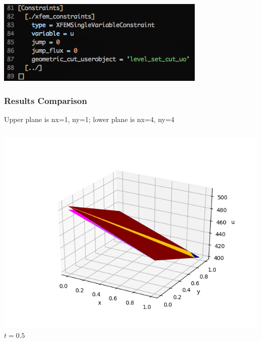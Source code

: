 \documentclass[]{beamer}
\begin{document}
\begin{frame}
\begin{columns}
\begin{center}
			\end{center}
	\end{columns}
	\begin{center}
	\includegraphics[scale=0.4]{figures/Screen-Constraints-2Dxyh1m}
	\end{center}
\end{frame}

\begin{frame}[t]\frametitle{Results Comparison}
  Upper plane is nx=1, ny=1; lower plane is nx=4, ny=4
  	\begin{columns}
			\begin{center}
			\includegraphics[scale=0.2]{figures/2D_xy_homog1mat_u_vs_x_05}\\
			\tiny$t=0.5$
			
			\null
			

\end{center}
\end{columns}
\end{frame}
\end{document}
